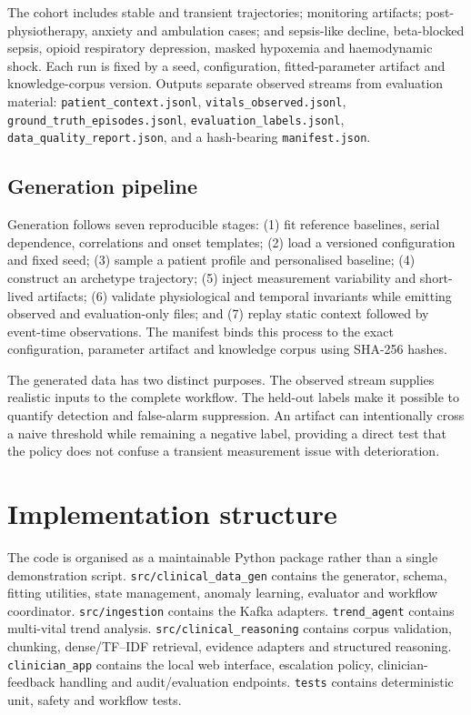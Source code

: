 \documentclass[11pt,a4paper]{article}
\begin{document}
The cohort includes stable and transient trajectories; monitoring artifacts; post-physiotherapy, anxiety and ambulation cases; and sepsis-like decline, beta-blocked sepsis, opioid respiratory depression, masked hypoxemia and haemodynamic shock. Each run is fixed by a seed, configuration, fitted-parameter artifact and knowledge-corpus version. Outputs separate observed streams from evaluation material: \texttt{patient\_context.jsonl}, \texttt{vitals\_observed.jsonl}, \texttt{ground\_truth\_episodes.jsonl}, \texttt{evaluation\_labels.jsonl}, \texttt{data\_quality\_report.json}, and a hash-bearing \texttt{manifest.json}.

\subsection{Generation pipeline}
Generation follows seven reproducible stages: (1) fit reference baselines, serial dependence, correlations and onset templates; (2) load a versioned configuration and fixed seed; (3) sample a patient profile and personalised baseline; (4) construct an archetype trajectory; (5) inject measurement variability and short-lived artifacts; (6) validate physiological and temporal invariants while emitting observed and evaluation-only files; and (7) replay static context followed by event-time observations. The manifest binds this process to the exact configuration, parameter artifact and knowledge corpus using SHA-256 hashes.

The generated data has two distinct purposes. The observed stream supplies realistic inputs to the complete workflow. The held-out labels make it possible to quantify detection and false-alarm suppression. An artifact can intentionally cross a naive threshold while remaining a negative label, providing a direct test that the policy does not confuse a transient measurement issue with deterioration.

\section{Implementation structure}
The code is organised as a maintainable Python package rather than a single demonstration script. \texttt{src/clinical\_data\_gen} contains the generator, schema, fitting utilities, state management, anomaly learning, evaluator and workflow coordinator. \texttt{src/ingestion} contains the Kafka adapters. \texttt{trend\_agent} contains multi-vital trend analysis. \texttt{src/clinical\_reasoning} contains corpus validation, chunking, dense/TF--IDF retrieval, evidence adapters and structured reasoning. \texttt{clinician\_app} contains the local web interface, escalation policy, clinician-feedback handling and audit/evaluation endpoints. \texttt{tests} contains deterministic unit, safety and workflow tests.
\end{document}
